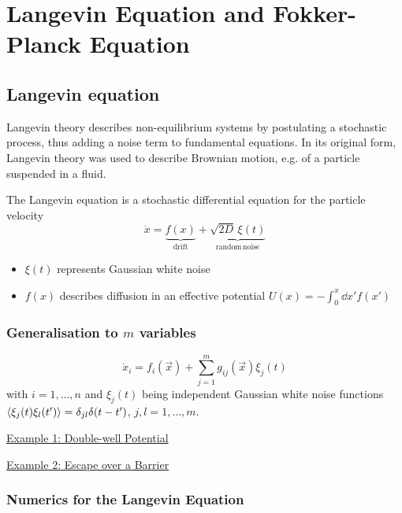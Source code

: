 \documentclass{notebook}
\begin{document}
\chapter{Langevin Equation and Fokker-Planck Equation}

\section{Langevin equation}


Langevin theory describes non-equilibrium systems by postulating a stochastic process, thus adding a noise term to fundamental equations. In its original form, Langevin theory was used to describe Brownian motion, e.g. of a particle suspended in a fluid.

\begin{theorem}
	The Langevin equation is a stochastic differential equation for the particle velocity
	\begin{equation}
	\dot{x} = \underbrace{f(x)}_{\mathrm{drift}} + \underbrace{\sqrt{2D} \, \xi(t)}_{\mathrm{random \, noise}}
	\label{langevin}
	\end{equation}
	\begin{itemize}
		\item $\xi(t)$ represents Gaussian white noise 
		\item{$f(x)$ describes diffusion in an effective potential $U(x) = - \int_0^{x}{\dd{x'} f(x')}$}
	\end{itemize}
\end{theorem}

\subsection*{Generalisation to $m$ variables}
%
\begin{equation}
\dot{x}_i =f_i(\vec x) + \sum_{j=1}^m g_{ij}(\vec x) \xi_j(t)
\end{equation}
%
with $i = 1, \dots, n$ and $\xi_j(t)$ being independent Gaussian white noise functions $\expval{\xi_j(t) \xi_l(t')} = \delta_{jl} \delta(t - t')$, $j, l = 1, \dots, m$.

\underline{Example 1: Double-well Potential}

\underline{Example 2: Escape over a Barrier}


\subsection*{Numerics for the Langevin Equation}
\end{document}
